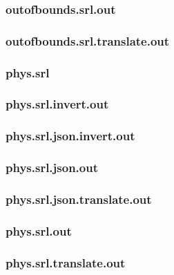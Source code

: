 \subsubsection{outofbounds.srl.out}
\label{app:outofbounds_srl.out}

\subsubsection{outofbounds.srl.translate.out}
\label{app:outofbounds_srl.translate.out}

\subsubsection{phys.srl}
\label{app:phys_srl}

\subsubsection{phys.srl.invert.out}
\label{app:phys_srl.invert.out}

\subsubsection{phys.srl.json.invert.out}
\label{app:phys_srl.json.invert.out}

\subsubsection{phys.srl.json.out}
\label{app:phys_srl.json.out}

\subsubsection{phys.srl.json.translate.out}
\label{app:phys_srl.json.translate.out}

\subsubsection{phys.srl.out}
\label{app:phys_srl.out}

\subsubsection{phys.srl.translate.out}
\label{app:phys_srl.translate.out}

